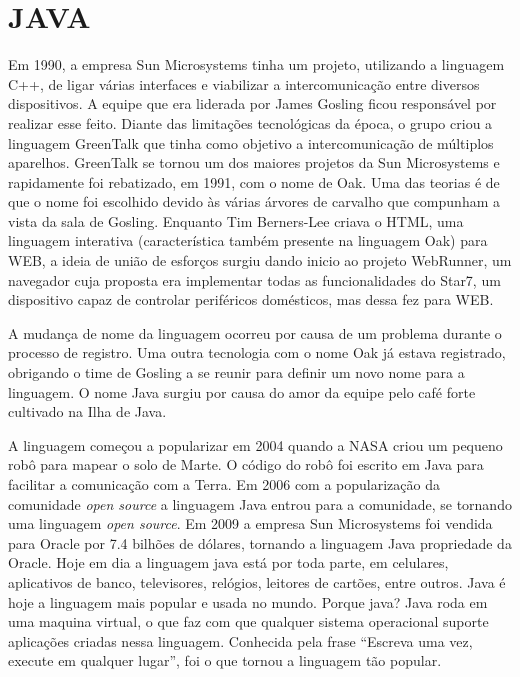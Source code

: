 \documentclass[
    12pt,               %
    openany,            %
    twoside,            %
    a4paper,            %
    brazil              %
    ]{abntex2}
\begin{document}
\chapter{JAVA}

Em 1990, a empresa Sun Microsystems tinha um projeto, utilizando a linguagem
C++, de ligar várias interfaces e viabilizar a intercomunicação entre diversos
dispositivos.  A equipe que era liderada por James Gosling ficou responsável
por realizar esse feito. Diante das limitações tecnológicas da época, o grupo
criou a linguagem GreenTalk que tinha como objetivo a intercomunicação de
múltiplos aparelhos.  GreenTalk se tornou um dos maiores projetos da Sun
Microsystems e rapidamente foi rebatizado, em 1991, com o nome de Oak. Uma das
teorias é de que o nome foi escolhido devido às várias árvores de carvalho que
compunham a vista da sala de Gosling. Enquanto Tim Berners-Lee criava o HTML,
uma linguagem interativa (característica também presente na linguagem Oak) para
WEB, a ideia de união de esforços surgiu dando inicio ao projeto WebRunner, um
navegador cuja proposta era implementar todas as funcionalidades do Star7, um
dispositivo capaz de controlar periféricos domésticos, mas dessa fez para WEB.

A mudança de nome da linguagem ocorreu por causa de um problema durante o
processo de registro.  Uma outra tecnologia com o nome Oak já estava
registrado, obrigando o time de Gosling a se reunir para definir um novo nome
para a linguagem. O nome Java surgiu por causa do amor da equipe pelo café
forte cultivado na Ilha de Java. 

A linguagem começou a popularizar em 2004 quando a NASA criou um pequeno robô
para mapear o solo de Marte. O código do robô foi escrito em Java para facilitar
a comunicação com a Terra. Em 2006 com a popularização da comunidade
\textit{open source} a linguagem Java entrou para a comunidade, se tornando uma
linguagem \textit{open source}.  Em 2009 a empresa Sun Microsystems foi vendida
para Oracle por 7.4 bilhões de dólares, tornando a linguagem Java propriedade da
Oracle. Hoje em dia a linguagem java está por toda parte, em celulares,
aplicativos de banco, televisores, relógios, leitores de cartões, entre outros.
Java é hoje a linguagem mais popular e usada no mundo.  Porque java?  Java roda
em uma maquina virtual, o que faz com que qualquer sistema operacional suporte
aplicações criadas nessa linguagem. Conhecida pela frase “Escreva uma vez,
execute em qualquer lugar”, foi o que tornou a linguagem tão popular.
\end{document}
